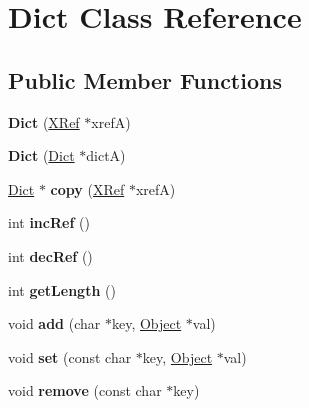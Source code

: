 \hypertarget{class_dict}{}\section{Dict Class Reference}
\label{class_dict}
\subsection*{Public Member Functions}
\begin{DoxyCompactItemize}
\item 
\mbox{\label{class_dict_a73f8f7e67bb9e45b125aa5fb293a8ada}} 
{\bfseries Dict} (\hyperlink{class_x_ref}{X\+Ref} $\ast$xrefA)
\item 
\mbox{\label{class_dict_a2dd91720dacded9f7520bbdde085d897}} 
{\bfseries Dict} (\hyperlink{class_dict}{Dict} $\ast$dictA)
\item 
\mbox{\label{class_dict_a17e7b5a55ddc90ce72ebdcc68398e643}} 
\hyperlink{class_dict}{Dict} $\ast$ {\bfseries copy} (\hyperlink{class_x_ref}{X\+Ref} $\ast$xrefA)
\item 
\mbox{\label{class_dict_a00cc47fdf898431dacd757e273952bfc}} 
int {\bfseries inc\+Ref} ()
\item 
\mbox{\label{class_dict_a632d0524a2ad68b3566f37e46152bb02}} 
int {\bfseries dec\+Ref} ()
\item 
\mbox{\label{class_dict_a7a21188ba0c7bdea1cdd305cdfbd8275}} 
int {\bfseries get\+Length} ()
\item 
\mbox{\label{class_dict_a46a35fcb02fca96865f548f804e5d7e5}} 
void {\bfseries add} (char $\ast$key, \hyperlink{class_object}{Object} $\ast$val)
\item 
\mbox{\label{class_dict_a7095038f634bf76af782be1ee35bb197}} 
void {\bfseries set} (const char $\ast$key, \hyperlink{class_object}{Object} $\ast$val)
\item 
\mbox{\label{class_dict_aaada262fb2fe41d1e327d31622572df8}} 
void {\bfseries remove} (const char $\ast$key)
\item 
\mbox{\label{class_dict_a4785dc64c7e583b96b62031d1641956f}} 

\end{DoxyCompactItemize}

